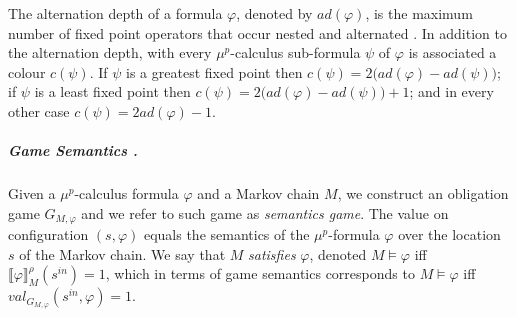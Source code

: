 \documentclass[a4paper,UKenglish]{oasics-v2016}
\begin{document}
The alternation depth of a formula 
$\varphi$, denoted by $ad(\varphi)$, is the maximum number of fixed point 
operators that occur nested and alternated \cite{EL86,CKP15}.
In addition to the alternation depth, with every $\mu^p$-calculus sub-formula 
$\psi$ of $\varphi$ is associated a colour $c(\psi)$. If $\psi$ is a greatest 
fixed point then $c(\psi)=2\big(ad(\varphi)-ad(\psi)\big)$; if $\psi$ is a 
least fixed point then $c(\psi)=2\big(ad(\varphi)-ad(\psi)\big)+1$; and in 
every other case $c(\psi)=2ad(\varphi)-1$.
%
%
%
\subparagraph{Game Semantics \cite{CKP15}.} Given a $\mu^p$-calculus formula 
$\varphi$ 
and 
a Markov chain $M$, we construct an obligation game $G_{M,\varphi}$ and we 
refer to such game as \emph{semantics game}. The value on 
configuration $(s, \varphi)$ equals the semantics of the $\mu^p$-formula 
$\varphi$ over the location $s$ of the Markov chain. We say that $M$ 
\textit{satisfies} $\varphi$, denoted $M \models \varphi$ iff $\llbracket 
\varphi \rrbracket ^\rho_M (s^{in})=1$, which in terms of game semantics 
corresponds to $M \models \varphi$ iff $val_{G_{M,\varphi}}(s^{in},\varphi)=1$.
%
%
%
\end{document}

